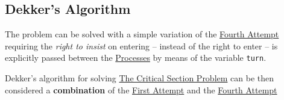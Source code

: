 \subsection{Dekker's Algorithm}\label{sub:cp_dekker_s_algorithm} %
The problem can be solved with a simple variation of the \hyperref[rem:fourth-algo]{Fourth Attempt} requiring the \textit{right to insist} on entering -- instead of the right to enter -- is explicitly passed between the \hyperref[def:process]{Processes} by means of the variable \texttt{turn}.
\begin{note}
    Dekker's algorithm for solving \hyperref[sec:cp_the_critical_section_problem]{The Critical Section Problem} can be then considered a \textbf{combination} of the \hyperref[rem:first-algo]{First Attempt} and the \hyperref[rem:fourth-algo]{Fourth Attempt}
\end{note}
